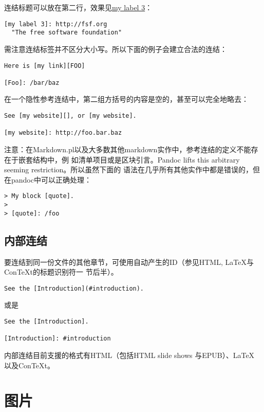 \documentclass[cn]{elegantbook}
\begin{document}
连结标题可以放在第二行，效果见\href{http://fsf.org}{my label 3}：

\begin{lstlisting}
[my label 3]: http://fsf.org
  "The free software foundation"
\end{lstlisting}

需注意连结标签并不区分大小写。所以下面的例子会建立合法的连结：

\begin{lstlisting}
Here is [my link][FOO]

[Foo]: /bar/baz
\end{lstlisting}

在一个隐性参考连结中，第二组方括号的内容是空的，甚至可以完全地略去：

\begin{lstlisting}
See [my website][], or [my website].

[my website]: http://foo.bar.baz
\end{lstlisting}

注意：在Markdown.pl以及大多数其他markdown实作中，参考连结的定义不能存在于嵌套结构中，例
如清单项目或是区块引言。Pandoc lifts this arbitrary seeming
restriction。所以虽然下面的
语法在几乎所有其他实作中都是错误的，但在pandoc中可以正确处理：

\begin{lstlisting}
> My block [quote].
>
> [quote]: /foo
\end{lstlisting}

\hypertarget{ux5185ux90e8ux8fdeux7ed3}{%
\subsection{内部连结}\label{ux5185ux90e8ux8fdeux7ed3}}

要连结到同一份文件的其他章节，可使用自动产生的ID（参见HTML,
LaTeX与ConTeXt的标题识别符一 节后半）。

\begin{lstlisting}
See the [Introduction](#introduction).
\end{lstlisting}

或是

\begin{lstlisting}
See the [Introduction].

[Introduction]: #introduction
\end{lstlisting}

内部连结目前支援的格式有HTML（包括HTML slide shows 与EPUB）、LaTeX
以及ConTeXt。

\hypertarget{ux56feux7247}{%
\section{图片}\label{ux56feux7247}}
\end{document}
